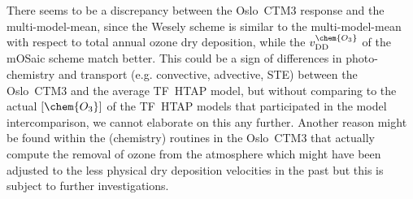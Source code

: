 \documentclass[gmd, manuscript]{copernicus}
\begin{document}
There seems to be a discrepancy between the Oslo~CTM3 response and the multi-model-mean, since the Wesely scheme is similar to the multi-model-mean with respect to total annual ozone dry deposition, while the $v_\text{DD}^\chem{O_3}$ of the mOSaic scheme match better. This could be a sign of differences in photo-chemistry and transport (e.g. convective, advective, STE) between the Oslo~CTM3 and the average TF~HTAP model, but without comparing to the actual $[\chem{O_3}]$ of the TF~HTAP models that participated in the model intercomparison, we cannot elaborate on this any further. Another reason might be found within the (chemistry) routines in the Oslo~CTM3 that actually compute the removal of ozone from the atmosphere which might have been adjusted to the less physical dry deposition velocities in the past but this is subject to further investigations.
\end{document}
